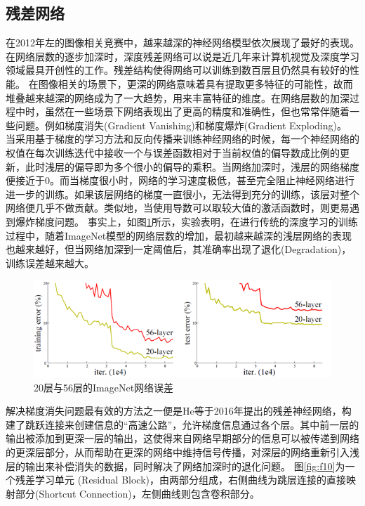 \subsection{残差网络}{}

在2012年左的图像相关竞赛中，越来越深的神经网络模型依次展现了最好的表现。在网络层数的逐步加深时，深度残差网络可以说是近几年来计算机视觉及深度学习领域最具开创性的工作。残差结构使得网络可以训练到数百层且仍然具有较好的性能。
在图像相关的场景下，更深的网络意味着具有提取更多特征的可能性，故而堆叠越来越深的网络成为了一大趋势，用来丰富特征的维度。在网络层数的加深过程中时，虽然在一些场景下网络表现出了更高的精度和准确性，但也常常伴随着一些问题。例如梯度消失(Gradient Vanishing)和梯度爆炸(Gradient Exploding)。
当采用基于梯度的学习方法和反向传播来训练神经网络的时候，每一个神经网络的权值在每次训练迭代中接收一个与误差函数相对于当前权值的偏导数成比例的更新，此时浅层的偏导即为多个很小的偏导的乘积。当网络加深时，浅层的网络梯度便接近于0。而当梯度很小时，网络的学习速度极低，甚至完全阻止神经网络进行进一步的训练。如果该层网络的梯度一直很小，无法得到充分的训练，该层对整个网络便几乎不做贡献。类似地，当使用导数可以取较大值的激活函数时，则更易遇到爆炸梯度问题。
事实上，如图\ref{fig:f9}所示，实验表明，在进行传统的深度学习的训练过程中，随着ImageNet模型的网络层数的增加，最初越来越深的浅层网络的表现也越来越好，但当网络加深到一定阈值后，其准确率出现了退化(Degradation)，训练误差越来越大。

\begin{figure}[h]
	\centering
	\includegraphics[scale=1]{figures/9.png}
	\caption{20层与56层的ImageNet网络误差}
	\label{fig:f9}
\end{figure}

解决梯度消失问题最有效的方法之一便是He等于2016年提出的残差神经网络，构建了跳跃连接来创建信息的“高速公路”，允许梯度信息通过各个层。其中前一层的输出被添加到更深一层的输出，这使得来自网络早期部分的信息可以被传递到网络的更深层部分，从而帮助在更深的网络中维持信号传播，对深层的网络重新引入浅层的输出来补偿消失的数据，同时解决了网络加深时的退化问题。
图\ref{fig:f10}为一个残差学习单元 (Residual Block)，由两部分组成，右侧曲线为跳层连接的直接映射部分(Shortcut Connection)，左侧曲线则包含卷积部分。

